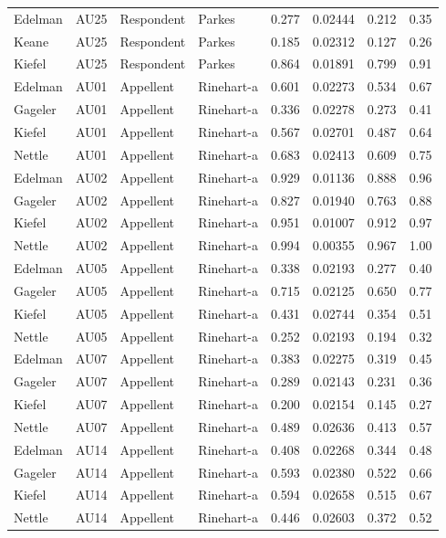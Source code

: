 \documentclass{monashthesis}
\begin{document}
\begin{center}
\begin{longtable}{llllllll}
Edelman & AU25 & Respondent & Parkes & 0.277 & 0.02444 & 0.212 & 0.35 \\
Keane & AU25 & Respondent & Parkes & 0.185 & 0.02312 & 0.127 & 0.26 \\
Kiefel & AU25 & Respondent & Parkes & 0.864 & 0.01891 & 0.799 & 0.91 \\
Edelman & AU01 & Appellent & Rinehart-a & 0.601 & 0.02273 & 0.534 & 0.67 \\
Gageler & AU01 & Appellent & Rinehart-a & 0.336 & 0.02278 & 0.273 & 0.41 \\
Kiefel & AU01 & Appellent & Rinehart-a & 0.567 & 0.02701 & 0.487 & 0.64 \\
Nettle & AU01 & Appellent & Rinehart-a & 0.683 & 0.02413 & 0.609 & 0.75 \\
Edelman & AU02 & Appellent & Rinehart-a & 0.929 & 0.01136 & 0.888 & 0.96 \\
Gageler & AU02 & Appellent & Rinehart-a & 0.827 & 0.01940 & 0.763 & 0.88 \\
Kiefel & AU02 & Appellent & Rinehart-a & 0.951 & 0.01007 & 0.912 & 0.97 \\
Nettle & AU02 & Appellent & Rinehart-a & 0.994 & 0.00355 & 0.967 & 1.00 \\
Edelman & AU05 & Appellent & Rinehart-a & 0.338 & 0.02193 & 0.277 & 0.40 \\
Gageler & AU05 & Appellent & Rinehart-a & 0.715 & 0.02125 & 0.650 & 0.77 \\
Kiefel & AU05 & Appellent & Rinehart-a & 0.431 & 0.02744 & 0.354 & 0.51 \\
Nettle & AU05 & Appellent & Rinehart-a & 0.252 & 0.02193 & 0.194 & 0.32 \\
Edelman & AU07 & Appellent & Rinehart-a & 0.383 & 0.02275 & 0.319 & 0.45 \\
Gageler & AU07 & Appellent & Rinehart-a & 0.289 & 0.02143 & 0.231 & 0.36 \\
Kiefel & AU07 & Appellent & Rinehart-a & 0.200 & 0.02154 & 0.145 & 0.27 \\
Nettle & AU07 & Appellent & Rinehart-a & 0.489 & 0.02636 & 0.413 & 0.57 \\
Edelman & AU14 & Appellent & Rinehart-a & 0.408 & 0.02268 & 0.344 & 0.48 \\
Gageler & AU14 & Appellent & Rinehart-a & 0.593 & 0.02380 & 0.522 & 0.66 \\
Kiefel & AU14 & Appellent & Rinehart-a & 0.594 & 0.02658 & 0.515 & 0.67 \\
Nettle & AU14 & Appellent & Rinehart-a & 0.446 & 0.02603 & 0.372 & 0.52 \\

\end{longtable}
\end{center}
\end{document}
